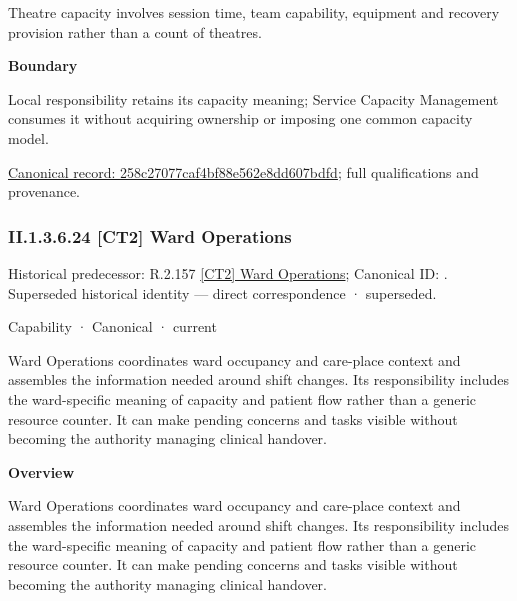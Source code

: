 Theatre capacity involves session time, team capability, equipment and recovery provision rather than a count of theatres.



\textbf{Boundary}



Local responsibility retains its capacity meaning; Service Capacity Management consumes it without acquiring ownership or imposing one common capacity model.


{\footnotesize \href{../../../../../../../continuum/strategy/capability/feature/258c27077caf4bf88e562e8dd607bdfd.md}{Canonical record: 258c27077caf4bf88e562e8dd607bdfd}; full qualifications and provenance.}\par
\subsubsection*{II.1.3.6.24 [CT2] Ward Operations}
\label{navigation:II.1.3.6.24}

{\small Historical predecessor: R.2.157 \hyperref[element:bf3d2e3581f24beda20a6a3a3348460e]{[CT2] Ward Operations}; Canonical ID: \texttt{}. Superseded historical identity — direct correspondence · superseded.}\par
\label{element:f996ecca728f4942a88b034aca818a99}
{\small Capability · Canonical · current}\par

Ward Operations coordinates ward occupancy and care-place context and assembles the information needed around shift changes. Its responsibility includes the ward-specific meaning of capacity and patient flow rather than a generic resource counter. It can make pending concerns and tasks visible without becoming the authority managing clinical handover.



\textbf{Overview}



Ward Operations coordinates ward occupancy and care-place context and assembles the information needed around shift changes. Its responsibility includes the ward-specific meaning of capacity and patient flow rather than a generic resource counter. It can make pending concerns and tasks visible without becoming the authority managing clinical handover.



